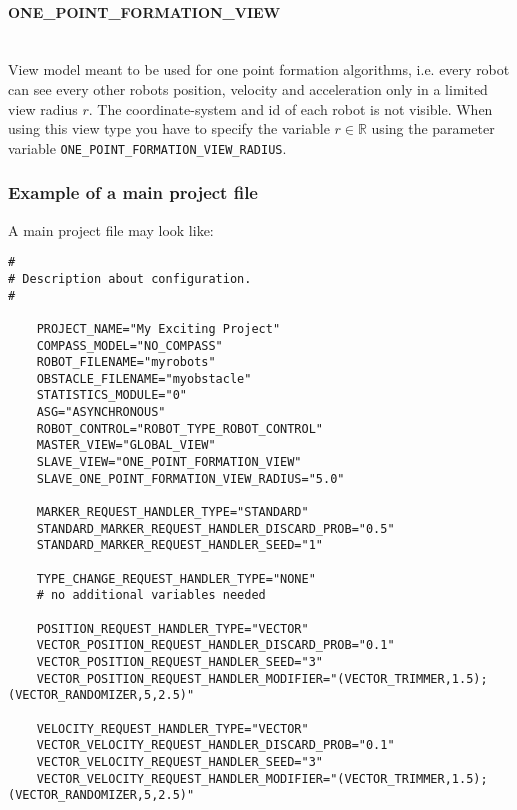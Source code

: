 \paragraph{ONE\_POINT\_FORMATION\_VIEW} \ \\
View model meant to be used for one point formation algorithms, i.e. every robot can see every other robots position, velocity and acceleration only in a limited view radius $r$. The coordinate-system and id of each robot is not visible. When using this view type you have to specify the variable $r \in \mathbb{R}$ using the parameter variable \texttt{ONE\_POINT\_FORMATION\_VIEW\_RADIUS}.


\subsubsection{Example of a main project file}
A main project file may look like:
\lstset{language=tcl}
\begin{lstlisting}
# 
# Description about configuration.
#
	
	PROJECT_NAME="My Exciting Project"
	COMPASS_MODEL="NO_COMPASS"
	ROBOT_FILENAME="myrobots"
	OBSTACLE_FILENAME="myobstacle"
	STATISTICS_MODULE="0"
	ASG="ASYNCHRONOUS"
	ROBOT_CONTROL="ROBOT_TYPE_ROBOT_CONTROL"
	MASTER_VIEW="GLOBAL_VIEW"
	SLAVE_VIEW="ONE_POINT_FORMATION_VIEW"
	SLAVE_ONE_POINT_FORMATION_VIEW_RADIUS="5.0"
	
	MARKER_REQUEST_HANDLER_TYPE="STANDARD"
	STANDARD_MARKER_REQUEST_HANDLER_DISCARD_PROB="0.5"
	STANDARD_MARKER_REQUEST_HANDLER_SEED="1"

	TYPE_CHANGE_REQUEST_HANDLER_TYPE="NONE"
	# no additional variables needed

	POSITION_REQUEST_HANDLER_TYPE="VECTOR"
	VECTOR_POSITION_REQUEST_HANDLER_DISCARD_PROB="0.1"
	VECTOR_POSITION_REQUEST_HANDLER_SEED="3"
	VECTOR_POSITION_REQUEST_HANDLER_MODIFIER="(VECTOR_TRIMMER,1.5);(VECTOR_RANDOMIZER,5,2.5)"

	VELOCITY_REQUEST_HANDLER_TYPE="VECTOR"
	VECTOR_VELOCITY_REQUEST_HANDLER_DISCARD_PROB="0.1"
	VECTOR_VELOCITY_REQUEST_HANDLER_SEED="3"
	VECTOR_VELOCITY_REQUEST_HANDLER_MODIFIER="(VECTOR_TRIMMER,1.5);(VECTOR_RANDOMIZER,5,2.5)"

\end{lstlisting}



